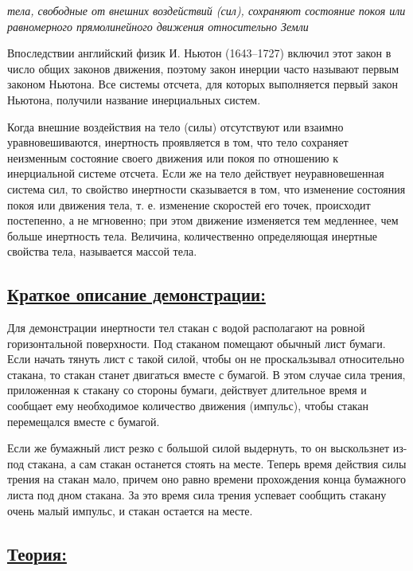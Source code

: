 \documentclass[14pt,a4paper,oneside]{extarticle}	%
\begin{document}
\begin{flushleft}
	
	\textit{тела, свободные от внешних воздействий (сил), сохраняют состояние 
покоя или равномерного прямолинейного движения относительно 
Земли}
\end{flushleft}


Впоследствии английский физик И. Ньютон (1643–1727) включил этот закон в число общих законов движения, поэтому закон инерции часто называют первым законом Ньютона. 
Все системы отсчета, для которых выполняется первый закон 
Ньютона, получили название инерциальных систем. 

Когда внешние воздействия на тело (силы) отсутствуют или взаимно уравновешиваются, инертность проявляется в том, что тело сохраняет неизменным состояние своего движения или покоя по отношению к инерциальной системе отсчета.
Если же на тело действует неуравновешенная система сил, то свойство инертности сказывается в том, что изменение состояния покоя или движения тела, т. е. изменение скоростей его точек, происходит постепенно, а не мгновенно; при этом движение изменяется тем медленнее, чем больше инертность тела.
Величина, количественно определяющая инертные свойства 
тела, называется массой тела. 

\newpage
\subsection*{\underline{Краткое описание демонстрации:}}

Для демонстрации инертности тел стакан с водой располагают на ровной горизонтальной поверхности.
Под стаканом помещают обычный лист бумаги.
Если начать тянуть лист с такой силой, чтобы он не проскальзывал относительно стакана, то стакан станет двигаться вместе с бумагой.
В этом случае сила трения, приложенная к стакану со стороны бумаги, действует длительное время и сообщает ему  необходимое количество движения (импульс), чтобы стакан перемещался вместе с бумагой. 

Если же бумажный лист резко с большой силой выдернуть, то он выскользнет из-под стакана, 
а сам стакан останется стоять на месте. 
Теперь время действия силы трения на стакан мало, причем оно равно времени прохождения конца 
бумажного листа под дном стакана.
За это время сила трения успевает сообщить стакану очень малый импульс, и стакан остается 
на месте. 

\newpage
\subsection*{\underline{Теория:}}
\end{document}
